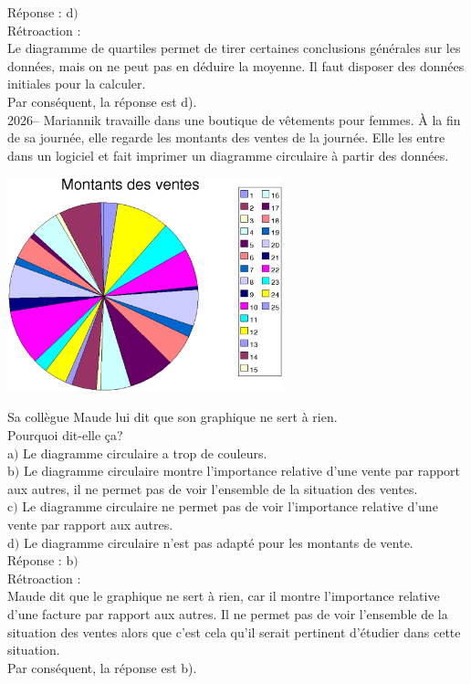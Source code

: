 \documentclass[letterpaper, 12pt]{article}
\begin{document}
R\'eponse : d$)$\\

R\'etroaction :\\
Le diagramme de quartiles permet de tirer certaines conclusions g\'en\'erales sur les donn\'ees, mais on ne peut pas en d\'eduire la moyenne. Il faut disposer des donn\'ees initiales pour la calculer.\\
Par cons\'equent, la r\'eponse est d).\\


2026-- Mariannik travaille dans une boutique de v\^etements pour femmes. \`A la fin de sa journ\'ee, elle regarde les montants des ventes de la journ\'ee. Elle les entre dans un logiciel et fait imprimer un diagramme circulaire \`a partir des donn\'ees.
\begin{center}
 \includegraphics[width=8cm]{Q2058b.eps}
\end{center}
Sa coll\`egue Maude lui dit que son graphique ne sert \`a rien.\\
Pourquoi dit-elle \c ca?\\

a$)$ Le diagramme circulaire a trop de couleurs.\\
b$)$ Le diagramme circulaire montre l'importance relative d'une vente par rapport aux autres, il ne permet pas de voir l'ensemble de la situation des ventes.\\
c$)$ Le diagramme circulaire ne permet pas de voir l'importance relative d'une vente par rapport aux autres.\\
d$)$ Le diagramme circulaire n'est pas adapt\'e pour les montants de vente.\\

R\'eponse : b$)$\\

R\'etroaction :\\
Maude dit que le graphique ne sert \`a rien, car il montre l'importance relative d'une facture par rapport aux autres. Il ne permet pas de voir l'ensemble de la situation des ventes alors que c'est cela qu'il serait pertinent d'\'etudier dans cette situation.\\
Par cons\'equent, la r\'eponse est b).\\
\end{document}
